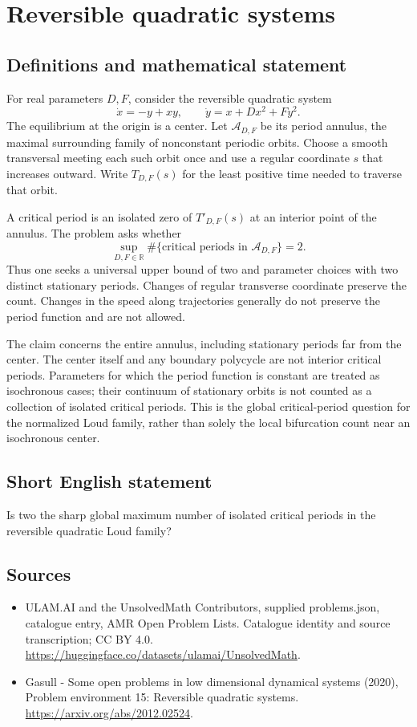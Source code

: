 \documentclass[11pt,a4paper]{article}
\begin{document}
\section*{Reversible quadratic systems}\label{statement}

\subsection{Definitions and mathematical statement}
For real parameters $D,F$, consider the reversible quadratic system
\[
 \dot x=-y+xy,\qquad \dot y=x+Dx^2+Fy^2.
\]
The equilibrium at the origin is a center. Let $\mathcal A_{D,F}$ be its
period annulus, the maximal surrounding family of nonconstant periodic
orbits. Choose a smooth transversal meeting each such orbit once and use
a regular coordinate $s$ that increases outward. Write $T_{D,F}(s)$ for
the least positive time needed to traverse that orbit.

A critical period is an isolated zero of $T'_{D,F}(s)$ at an interior
point of the annulus. The problem asks whether
\[
 \sup_{D,F\in\mathbb R}
  \#\{\text{critical periods in }\mathcal A_{D,F}\}=2.
\]
Thus one seeks a universal upper bound of two and parameter choices with
two distinct stationary periods. Changes of regular transverse coordinate
preserve the count. Changes in the speed along trajectories generally do
not preserve the period function and are not allowed.

The claim concerns the entire annulus, including stationary periods far
from the center. The center itself and any boundary polycycle are not
interior critical periods. Parameters for which the period function is
constant are treated as isochronous cases; their continuum of stationary
orbits is not counted as a collection of isolated critical periods. This
is the global critical-period question for the normalized Loud family,
rather than solely the local bifurcation count near an isochronous center.
\subsection{Short English statement}
Is two the sharp global maximum number of isolated critical periods in the reversible quadratic Loud family?
\subsection{Sources}
\begin{itemize}
\item[S1] ULAM.AI and the UnsolvedMath Contributors, supplied problems.json, catalogue entry, AMR Open Problem Lists. Catalogue identity and source transcription; CC BY 4.0.
\url{https://huggingface.co/datasets/ulamai/UnsolvedMath}.
\item[S2] Gasull - Some open problems in low dimensional dynamical systems (2020), Problem environment 15: Reversible quadratic systems. 
\url{https://arxiv.org/abs/2012.02524}.
\end{itemize}
\end{document}
